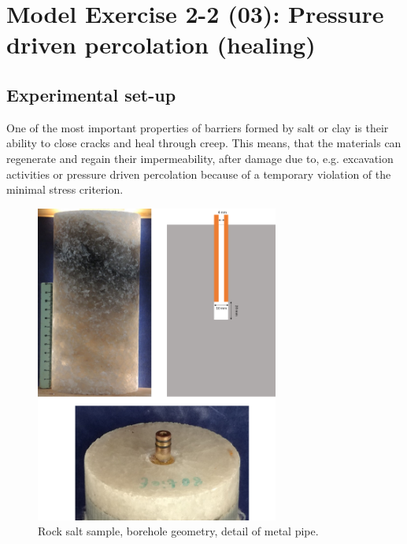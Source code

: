 \section{Model Exercise 2-2 (03): Pressure driven percolation (healing)}
\label{sec:mex03}
\subsection{Experimental set-up}
One of the most important properties of barriers formed by salt or clay is their ability to close cracks and heal through creep. This means, that the materials can regenerate and regain their impermeability, after damage due to, e.g. excavation activities or  pressure driven percolation because of a temporary violation of the minimal stress criterion.

\begin{figure}[!ht]
\centering
\includegraphics[width=8cm]{figures/mex3-exper-setup.png}
\caption{Rock salt sample, borehole geometry, detail of metal pipe.}
\label{fig:ME3-exper-setup}
\end{figure}

